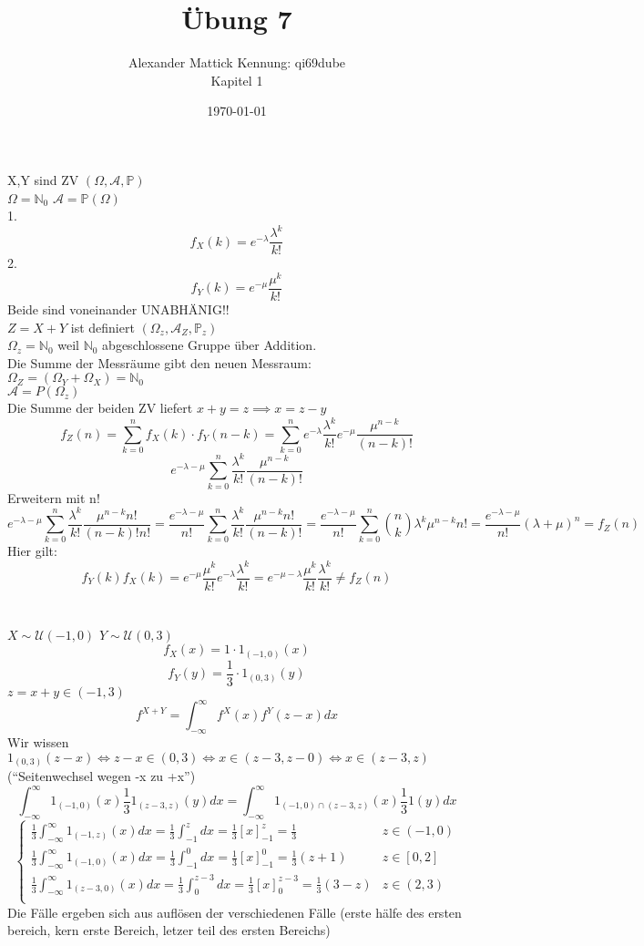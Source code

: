 \documentclass{article}
\author{
Alexander Mattick Kennung: qi69dube\\
Kapitel 1
}
\date{\today}
\title{Übung 7}
\begin{document}
	\maketitle
	X,Y sind ZV $(\Omega, \mathcal{A}, \mathbb{P})$\\
	$\Omega = \mathbb{N}_0$ $\mathcal{A} = \mathbb{P}(\Omega)$\\
	1.
	\[f_X(k)=e^{-\lambda} \frac{\lambda^k}{k!}\]
	2.
	\[f_Y(k)=e^{-\mu} \frac{\mu^k}{k!}\]
	Beide sind voneinander UNABHÄNIG!!\\
	$Z =X+Y$ ist definiert $(\Omega_z, \mathcal{A}_Z,\mathbb{P}_z)$\\
	$\Omega_z = \mathbb{N}_0$ weil $\mathbb{N}_0$ abgeschlossene Gruppe über Addition.\\
	Die Summe der Messräume gibt den neuen Messraum:\\
	$\Omega_Z = (\Omega_Y+\Omega_X) = \mathbb{N}_0$\\
	$\mathcal{A} = P(\Omega_z)$\\
	Die Summe der beiden ZV liefert $x+y=z\implies x=z-y$\\
	\[f_Z(n)=\sum^n_{k=0}f_X(k)\cdot f_Y(n-k) = \sum^n_{k=0} e^{-\lambda}\frac{\lambda^k}{k!}e^{-\mu}\frac{\mu^{n-k}}{(n-k)!}\]
	\[ e^{-\lambda-\mu}\sum^n_{k=0}\frac{\lambda^k}{k!}\frac{\mu^{n-k}}{(n-k)!}\]
	Erweitern mit n!
	\[ e^{-\lambda-\mu}\sum^n_{k=0}\frac{\lambda^k}{k!}\frac{\mu^{n-k}n!}{(n-k)!n!}=\frac{e^{-\lambda-\mu}}{n!}\sum^n_{k=0}\frac{\lambda^k}{k!}\frac{\mu^{n-k}n!}{(n-k)!}=\frac{e^{-\lambda-\mu}}{n!}\sum^n_{k=0}\binom{n}{k}\lambda^k\mu^{n-k}n! = \frac{e^{-\lambda-\mu}}{n!}(\lambda+\mu)^n =f_Z(n)\]
	Hier gilt:\\
	\[f_Y(k)f_X(k) =e^{-\mu} \frac{\mu^k}{k!} e^{-\lambda} \frac{\lambda^k}{k!} = e^{-\mu-\lambda} \frac{\mu^k}{k!} \frac{\lambda^k}{k!} \neq f_Z(n)\]
	\section{}
	$X\sim\mathcal{U}(-1,0)$ $Y\sim\mathcal{U}(0,3)$\\
	\[f_X(x) = 1\cdot 1_{(-1,0)}(x)\]
	\[f_Y(y) = \frac{1}{3}\cdot 1_{(0,3)}(y)\]
	$z=x+y\in (-1,3)$\\
	\[f^{X+Y} = \int^\infty_{-\infty}f^X(x)f^Y(z-x)dx\]
	Wir wissen $1_{(0,3)}(z-x)\iff z-x \in (0,3)\iff x \in (z-3,z-0)\iff x \in (z-3,z)$ (``Seitenwechsel wegen -x zu +x'')
	\[\int^\infty_{-\infty}1_{(-1,0)}(x)\frac{1}{3} 1_{(z-3,z)}(y)dx =\int^\infty_{-\infty}1_{(-1,0)\cap (z-3,z)}(x)\frac{1}{3} 1(y)dx\]
	\[\begin{cases}\frac{1}{3}\int^\infty_{-\infty}1_{(-1,z)}(x)dx =\frac{1}{3} \int^z_{-1}dx =\frac{1}{3} [x]^z_{-1} = \frac{1}{3}&z\in(-1,0)\\
	\frac{1}{3}\int^\infty_{-\infty}1_{(-1,0)}(x)dx =\frac{1}{3} \int^0_{-1}dx =\frac{1}{3} [x]^0_{-1} = \frac{1}{3}(z+1)&z\in[0,2]\\
	\frac{1}{3}\int^\infty_{-\infty}1_{(z-3,0)}(x)dx =\frac{1}{3} \int^{z-3}_{0}dx =\frac{1}{3} [x]^{z-3}_{0} = \frac{1}{3}(3-z)&z\in(2,3)\\
	 \end{cases}\]
	 Die Fälle ergeben sich aus auflösen  der verschiedenen Fälle (erste hälfe des ersten bereich, kern erste Bereich,  letzer teil des ersten Bereichs)
\end{document}
